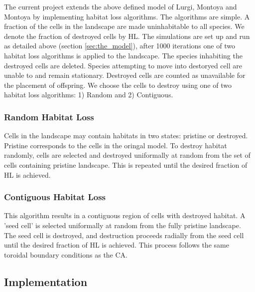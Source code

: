 
The current project extends the above defined model of Lurgi, Montoya and Montoya \cite{lurgi2015effects} by implementing habitat loss algorithms. The algorithms are simple. A fraction of the cells in the landscape are made uninhabitable to all species. We denote the fraction of destroyed cells by HL. The simulations are set up and run as detailed above (section \ref{sec:the_model}), after 1000 iterations one of two habitat loss algorithms is applied to the landscape. The species inhabiting the destroyed cells are deleted. Species attempting to move into destoryed cell are unable to and remain stationary. Destroyed cells are counted as unavailable for the placement of offspring. We choose the cells to destroy using one of two habitat loss algorithms: 1) Random and 2) Contiguous.

\subsubsection{Random Habitat Loss}
\label{sec:random_algorithm}  

Cells in the landscape may contain habitats in two states: pristine or destroyed. Pristine corresponds to the cells in the oringal model. To destroy habitat randomly, cells are selected and destroyed uniformally at random from the set of cells containing pristine landscape. This is repeated until the desired fraction of HL is achieved.   

\subsubsection{Contiguous Habitat Loss}
\label{sec:contiguous_algorithm}  

This algorithm results in a contiguous region of cells with destroyed habitat. A 'seed cell' is selected uniformally at random from the fully pristine landscape. The seed cell is destroyed, and destruction proceeds radially from the seed cell until the desired fraction of HL is achieved. This process follows the same toroidal boundary conditions as the CA. 


\subsection{Implementation}
\label{sec:implementation}


